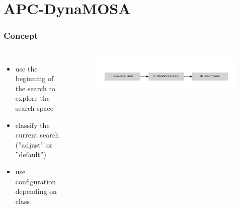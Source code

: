 \section{APC-DynaMOSA} 

\begin{frame}
	\frametitle{Concept}
	
	\begin{columns}[c]
		
		
		\begin{itemize}
			\item use the beginning of the search to explore the search space
			\item classify the current search (''adjust'' or ''default'')
			\item use configuration depending on class
		\end{itemize}
		
		
		\begin{figure}
			\includegraphics[width=1\textwidth]{figures/flowchart_phases}
		\end{figure}
		
	\end{columns}
	
\end{frame}

